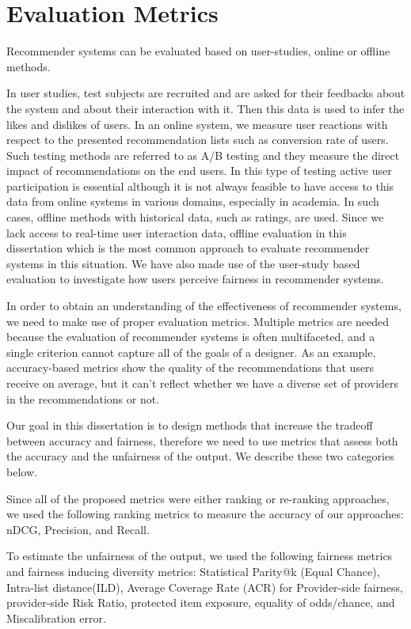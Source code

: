 \section{Evaluation Metrics}
\label{sec:eval}
    
    Recommender systems can be evaluated based on user-studies, online or offline methods.
    
    In user studies, test subjects are recruited and are asked for their feedbacks about the system and about their interaction with it. Then this data is used to infer the likes and dislikes of users. 
    In an online system, we measure user reactions with respect to the presented recommendation lists such as conversion rate of users. Such testing methods are referred to as A/B testing and they measure the direct impact of recommendations on the end users. In this type of testing active user participation is essential although it is not always feasible to have access to this data from online systems in various domains, especially in academia. In such cases, offline methods with historical data, such as ratings, are used. Since we lack access to real-time user interaction data, offline evaluation in this dissertation which is the most common approach to evaluate recommender systems in this situation. We have also made use of the user-study based evaluation to investigate  how users perceive fairness in recommender systems.
    
    In order to obtain an understanding of the effectiveness of recommender systems, we need to make use of proper evaluation metrics. Multiple metrics are needed because the evaluation of recommender systems is often multifaceted, and a single criterion cannot capture all of the goals of a designer. As an example, accuracy-based metrics show the quality of the recommendations that users receive on average, but it can't reflect whether we have a diverse set of providers in the recommendations or not. 
    
    Our goal in this dissertation is to design methods that increase the tradeoff between accuracy and fairness, therefore we need to use metrics that assess both the accuracy and the unfairness of the output. We describe these two categories below.
    
    Since all of the proposed metrics were either ranking or re-ranking approaches, we used the following ranking metrics to measure the accuracy of our approaches: nDCG, Precision, and Recall.
    
    To estimate the unfairness of the output, we used the following fairness metrics and fairness inducing diversity metrics: Statistical Parity@k (Equal Chance), Intra-list distance(ILD), Average Coverage Rate (ACR) for Provider-side fairness, provider-side Risk Ratio, protected item exposure, equality of odds/chance, and Miscalibration error.
    
